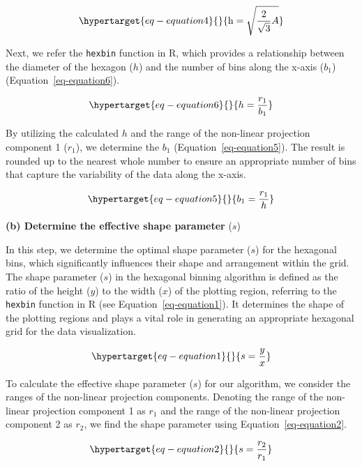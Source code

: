 \documentclass[
  12pt]{article}
\begin{document}
\begin{equation}\protect\hypertarget{eq-equation4}{}{
 \text{h} = \sqrt{\frac{2}{\sqrt{3}}A}
}\label{eq-equation4}\end{equation}

Next, we refer the \texttt{hexbin} function in R, which provides a
relationship between the diameter of the hexagon (\(h\)) and the number
of bins along the x-axis (\(b_1\)) (Equation~\ref{eq-equation6}).

\begin{equation}\protect\hypertarget{eq-equation6}{}{
 h = \frac{r_1}{b_1}
}\label{eq-equation6}\end{equation}

By utilizing the calculated \(h\) and the range of the non-linear
projection component 1 (\(r_1\)), we determine the \(b_1\)
(Equation~\ref{eq-equation5}). The result is rounded up to the nearest
whole number to ensure an appropriate number of bins that capture the
variability of the data along the x-axis.

\begin{equation}\protect\hypertarget{eq-equation5}{}{
 b_1 = \frac{r_1}{h}
}\label{eq-equation5}\end{equation}

\textbf{(b) Determine the effective shape parameter} (\(s\))

In this step, we determine the optimal shape parameter (\(s\)) for the
hexagonal bins, which significantly influences their shape and
arrangement within the grid. The shape parameter (\(s\)) in the
hexagonal binning algorithm is defined as the ratio of the height
(\(y\)) to the width (\(x\)) of the plotting region, referring to the
\texttt{hexbin} function in R (see Equation~\ref{eq-equation1}). It
determines the shape of the plotting regions and plays a vital role in
generating an appropriate hexagonal grid for the data visualization.

\begin{equation}\protect\hypertarget{eq-equation1}{}{
  s = \frac{y}{x}
}\label{eq-equation1}\end{equation}

To calculate the effective shape parameter (\(s\)) for our algorithm, we
consider the ranges of the non-linear projection components. Denoting
the range of the non-linear projection component 1 as \(r_1\) and the
range of the non-linear projection component 2 as \(r_2\), we find the
shape parameter using Equation~\ref{eq-equation2}.

\begin{equation}\protect\hypertarget{eq-equation2}{}{
s = \frac{r_2}{r_1}
}\label{eq-equation2}\end{equation}
\end{document}
